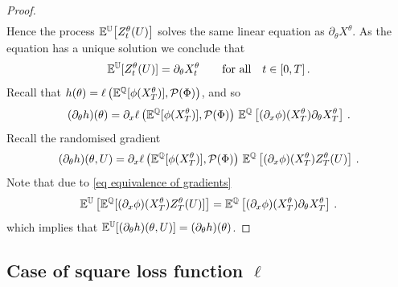 \begin{proof}
\[\begin{split}
\end{split}
\]
Hence the process $\mathbb{E}^{\mathbb{U}} \big[Z_t^{\theta}(U)\big]$ solves the same linear equation as $\partial_\theta X^\theta$. 
As the equation has a unique solution we conclude that  
\begin{equation}\label{eq equivalence of gradients}
\mathbb{E}^{\mathbb{U}}[ Z_t^{\theta}(U) ] = \partial_\theta X_t^{\theta} \qquad \textup{for all} \quad t \in [0,T]\,.
\end{equation}
Recall that
$
h(\theta)= \ell\left(\mathbb{E}^{\mathbb{Q}}[\phi(X_T^{\theta})], \mathcal{P}(\Phi)\right)
$,
and so
\[
(\partial_\theta h)(\theta) = \partial_x \ell \left(\mathbb{E}^{\mathbb{Q}}[\phi(X_T^{\theta})] ,\mathcal{P}(\Phi)\right) \,\mathbb{E}^{ \mathbb{Q}}\left[(\partial_x\phi)( X_T^{\theta})\partial_\theta X_T^{\theta}\right]\,.
\]
Recall the randomised gradient 
\[
(\partial_\theta h)(\theta,U) =  \partial_x \ell  \left(\mathbb{E}^{\mathbb{Q}}[\phi(X_T^{\theta})] ,\mathcal{P}(\Phi)\right) \,\mathbb{E}^{ \mathbb{Q}}\left[(\partial_x\phi)( X_T^{\theta})Z_T^{\theta}(U) \right]\,.
\]
Note that due to \eqref{eq equivalence of gradients} 
\[
\mathbb{E}^{\mathbb{U}}\left[\mathbb{E}^{ \mathbb{Q}}[(\partial_x\phi)( X_T^{\theta})Z_T^{\theta}(U) ]\right] 
 =\mathbb{E}^{ \mathbb{Q}}\left[(\partial_x\phi)( X_T^{\theta})\partial_\theta X_T^{\theta}\right]\,.
\]
which implies that $\mathbb{E}^{\mathbb{U}}[(\partial_\theta h)(\theta,U)] = (\partial_\theta h)(\theta) $. 
\end{proof}



\subsection{Case of square loss function $\ell$}\label{sec unbiased error}

